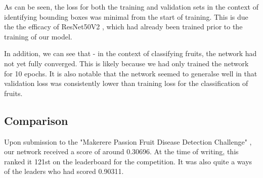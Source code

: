 As can be seen, the loss for both the training and validation sets in the context of identifying bounding boxes was minimal from the start of training. This is due the the efficacy of ResNet50V2 \cite{ResNet50V2}, which had already been trained prior to the training of our model.

In addition, we can see that - in the context of classifying fruits, the network had not yet fully converged. This is likely because we had only trained the network for 10 epochs. It is also notable that the network seemed to generalse well in that validation loss was consistently lower than training loss for the classification of fruits.

\subsection{Comparison}
Upon submission to the "Makerere Passion Fruit Disease Detection Challenge" \cite{zindi}, our network received a score of around 0.30696. At the time of writing, this ranked it 121st on the leaderboard for the competition. It was also quite a ways of the leaders who had scored 0.90311.